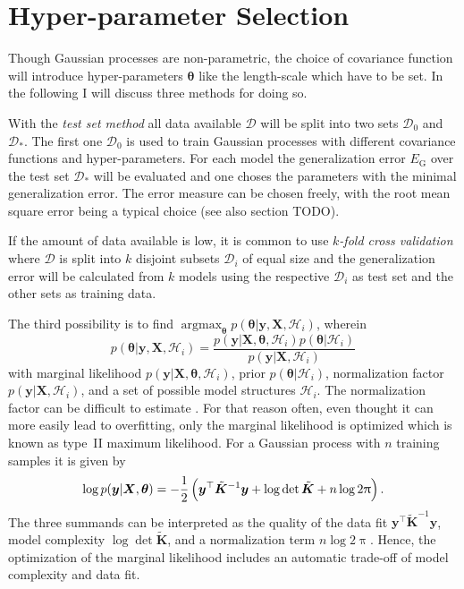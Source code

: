 \documentclass[11pt,a4paper]{scrreprt}
\newcommand{\vc}[1]{\bm{#1}}
\newcommand{\mat}[1]{\bm{#1}}
\newcommand{\T}{^{\top}}
\DeclareMathOperator*{\argmax}{argmax}
\newcommand{\newterm}[1]{\emph{#1}}
\begin{document}
\section{Hyper-parameter Selection}
Though Gaussian processes are non-parametric, the choice of covariance function 
will introduce hyper-parameters $\vc \theta$ like the length-scale which have to 
be set.  In the following I will discuss three methods for doing so.

With the \newterm{test set method} all data available $\mathcal{D}$ will be 
split into two sets $\mathcal{D}_0$ and $\mathcal{D}_*$. The first one 
$\mathcal{D}_0$ is used to train Gaussian processes with different covariance 
functions and hyper-parameters. For each model the generalization error 
$E_{\text{G}}$ over the test set $\mathcal{D}_*$ will be evaluated and one 
choses the parameters with the minimal generalization error. The error measure 
can be chosen freely, with the root mean square error being a typical choice 
(see also section TODO).

If the amount of data available is low, it is common to use \newterm{$k$-fold 
    cross validation} where $\mathcal{D}$ is split into $k$ disjoint subsets 
$\mathcal{D}_i$ of equal size and the generalization error will be calculated 
from $k$ models using the respective $\mathcal{D}_i$ as test set and the other 
sets as training data.

The third possibility is to find $\argmax_{\vc \theta} p(\vc\theta | \vc y, \mat 
X, \mathcal{H}_i)$, wherein
\begin{equation}
    p(\vc\theta | \vc y, \mat X, \mathcal{H}_i) = \frac{p(\vc y | \mat X, 
        \vc\theta, \mathcal{H}_i) p(\vc\theta | \mathcal{H}_i)}{p(\vc y | \mat 
        X, \mathcal{H}_i)}
\end{equation}
with marginal likelihood $p(\vc y | \mat X, \vc\theta, \mathcal{H}_i)$, prior 
$p(\vc\theta | \mathcal{H}_i)$, normalization factor $p(\vc y | \mat X, 
\mathcal{H}_i)$, and a set of possible model structures $\mathcal{H}_i$. The 
normalization factor can be difficult to estimate 
\parencite[109]{Rasmussen:2006vz}. For that reason often, even thought it can 
more easily lead to overfitting, only the marginal likelihood is optimized which 
is known as type~II maximum likelihood. For a Gaussian process with $n$ training 
samples it is given by
\begin{equation}
    \log p(\vc y | \mat X, \vc\theta) = -\frac{1}{2}\del{\vc y\T \tilde{\mat 
            K}^{-1} \vc y + \log \det \tilde{\mat K} + n \log 2\uppi} \text{.}
\end{equation}
The three summands can be interpreted as the quality of the data fit $\vc y\T 
\tilde{\mat K}^{-1} \vc y$, model complexity $\log \det \tilde{\mat K}$, and 
a normalization term $n \log 2\uppi$. Hence, the optimization of the marginal 
likelihood includes an automatic trade-off of model complexity and data fit.
\end{document}
